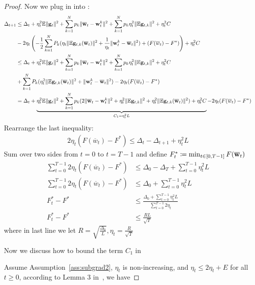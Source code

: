 \begin{proof}
Now we plug in \eq{\ref{eq:a24}} into \eq{\ref{eq:main2}}:
\begin{align}
	\Delta_{t+1} & \leq \Delta_t + 
	\eta_{t}^{2} \mathbb{E}\| {\mathbf{g}}_{t} \|^{2} + \sum_{k=1}^N p_k \|\overline{{\mathbf{w}}}_t - {\mathbf{w}}_t^k\|^2 +  \sum_{k=1}^N p_k \eta_t^2 \|\mathbb{E} {\mathbf{g}}_{t,k}\|^2 + \eta_t^2 C \\
	 &- 2 \eta_t \left(-\frac{1}{2} \sum_{k=1}^{N} P_{k} (\eta_t \|\mathbb{E} {\mathbf{g}}_{t,k}(\overline{{\mathbf{w}}}_t) \|^2 + \frac{1}{\eta_t} \|{\mathbf{w}}_t^k - \overline{{\mathbf{w}}}_t\|^2) + (F(\overline{w}_t) - F^*) \right)  + \eta_t^2 C \\
	& \leq \Delta_t + 
	\eta_{t}^{2} \mathbb{E}\| {\mathbf{g}}_{t} \|^{2} + \sum_{k=1}^N p_k \|\overline{{\mathbf{w}}}_t - {\mathbf{w}}_t^k\|^2 +  \sum_{k=1}^N p_k \eta_t^2 \|\mathbb{E} {\mathbf{g}}_{t,k}\|^2  + \eta_t^2 C  \\
	& +\sum_{k=1}^{N} P_{k} (\eta_t^2 \|\mathbb{E} {\mathbf{g}}_{t,k}(\overline{{\mathbf{w}}}_t) \|^2 + \|{\mathbf{w}}_t^k - \overline{{\mathbf{w}}}_t\|^2) - 2\eta_t (F(\overline{w}_t) - F^*) \\
	& = \Delta_t + \underbrace{\eta_{t}^{2} \mathbb{E}\| {\mathbf{g}}_{t} \|^{2} +\sum_{k=1}^N p_k  ( 2\|\overline{{\mathbf{w}}}_t - {\mathbf{w}}_t^k\|^2  +  \eta_t^2 \|\mathbb{E} {\mathbf{g}}_{t,k}\|^2 + \eta_t^2 \|\mathbb{E} {\mathbf{g}}_{t,k}(\overline{{\mathbf{w}}}_t) \|^2 ) + \eta_t^2 C }_{C_1 = \eta_t^2L}  - 2\eta_t (F(\overline{w}_t) - F^*) \label{eq:main3}
\end{align}
Rearrange the last inequality:
\begin{align}
	2\eta_t (F(\overline{w}_t) - F^*) \leq \Delta_t - \Delta_{t+1} + \eta_t^2 L
\end{align}
Sum over two sides from $t=0$ to $t = T- 1$ and define $F^*_t \coloneqq \min_{t \in [0, T-1]} F(\overline{{\mathbf{w}}}_t)$
\begin{align}
	\sum_{t=0}^{T-1} 2\eta_t(F(\overline{w}_t) - F^*) & \leq \Delta_0 - \Delta_T + \sum_{t=0}^{T-1} \eta_t^2 L\\
	\sum_{t=0}^{T-1} 2\eta_t(F(\overline{w}_t) - F^*) & \leq \Delta_0 + \sum_{t=0}^{T-1} \eta_t^2 L\\
    F^*_t - F^* &\leq \frac{\Delta_0 + \sum_{t=0}^{T-1} \eta_t^2L}{ \sum_{t=0}^{T-1}  2 \eta_t}\\
    F^*_t - F^* &\leq \frac{RL}{\sqrt{T}}
\end{align}
where in last line we let $R = \sqrt{ \frac{\Delta_0}{L}}, \eta_t = \frac{R}{\sqrt{T}}$

Now we discuss how to bound the term $C_1$ in \eq{\ref{eq:main3}}

Assume Assumption~\ref{ass:subgrad2}, $\eta_t$ is non-increasing, and $\eta_t \leq 2\eta_t+E$ for all $t\geq 0$, according to Lemma 3 in~\cite{li2019convergence}, we have



\end{proof}

